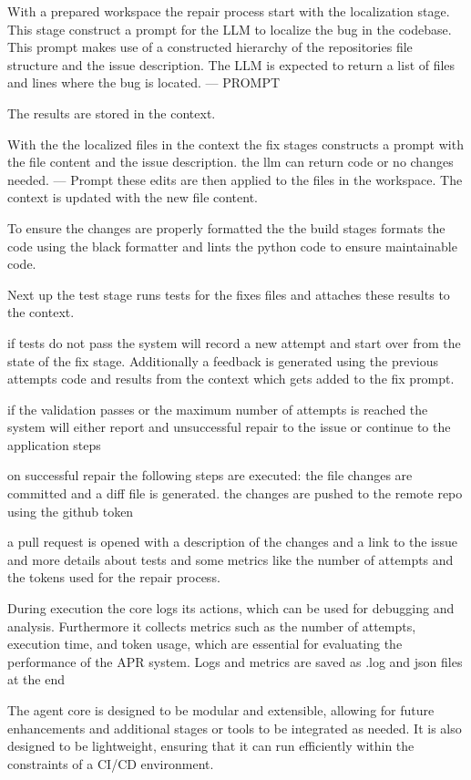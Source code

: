 With a prepared workspace the repair process start with the localization stage. This stage construct a prompt for the LLM to localize the bug in the codebase. This prompt makes use of a constructed hierarchy of the repositories file structure and the issue description. The LLM is expected to return a list of files and lines where the bug is located.
--- PROMPT

The results are stored in the context.

With the the localized files in the context the fix stages constructs a prompt with the file content and the issue description. the llm can return code or no changes needed.
--- Prompt
these edits are then applied to the files in the workspace. The context is updated with the new file content.

To ensure the changes are properly formatted the the build stages formats the code using the black formatter and lints the python code to ensure maintainable code.

Next up the test stage runs tests for the fixes files and attaches these results to the context.

if tests do not pass the system will record a new attempt and start over from the state of the fix stage. Additionally a feedback is generated using the previous attempts code and results from the context which gets added to the fix prompt.

if the validation passes or  the maximum number of attempts is reached the system will either report and unsuccessful repair to the issue or continue to the application steps

on successful repair the following steps are executed:
the file changes are committed and a diff file is generated.
the changes are pushed to the remote repo using the github token

a pull request is opened with a description of the changes and a link to the issue and more details about tests and some metrics like the number of attempts and the tokens used for the repair process.

During execution the core logs its actions, which can be used for debugging and analysis. Furthermore it collects metrics such as the number of attempts, execution time, and token usage, which are essential for evaluating the performance of the APR system. Logs and metrics are saved as .log and json files at the end

The agent core is designed to be modular and extensible, allowing for future enhancements and additional stages or tools to be integrated as needed. It is also designed to be lightweight, ensuring that it can run efficiently within the constraints of a CI/CD environment.




